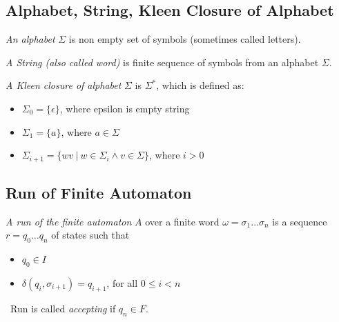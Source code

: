 \subsection{Alphabet, String, Kleen Closure of Alphabet}
\label{defAlphabet}
\begin{definition}
	\emph{An alphabet} $\Sigma$ is non empty set of symbols (sometimes called letters).
\end{definition}
\begin{definition}
	\emph{A String (also called word)} is finite sequence of symbols from an alphabet $\Sigma$.
\end{definition}
\begin{definition}
	\emph{A Kleen closure of alphabet} $\Sigma$ is $\Sigma^{*}$, which is defined as:
	\begin{itemize}
		\item $\Sigma_0=\{\epsilon\}$, where epsilon is empty string
		\item $\Sigma_1=\{a\}$, where $a\in \Sigma$
		\item $\Sigma_{i+1}=\{wv\ |\ w\in \Sigma_i \wedge v \in \Sigma\}$, where $i>0$
	\end{itemize}
\end{definition}

	\subsection{Run of Finite Automaton}
	\label{defRun}
	\begin{definition}
		\emph{A run of the finite automaton }$A$ over a finite word $\omega=\sigma_1\dots\sigma_n$ is a sequence $r=q_0\dots q_n$ of states such that
		\begin{itemize}
			\item $q_0\in I$
			\item $\delta(q_i,\sigma_{i+1})=q_{i+1}$, for all $0\leq i < n$
		\end{itemize}\
		Run is called \emph{accepting} if $q_n\in F$.
	\end{definition}

